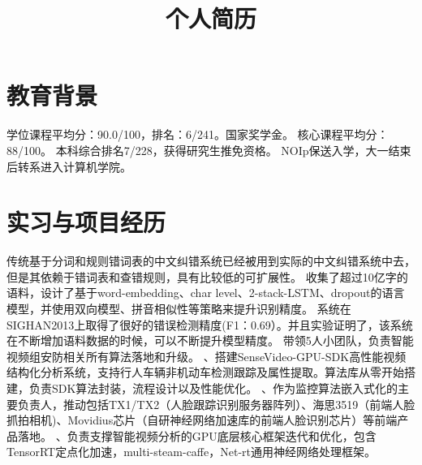 \documentclass[11pt,a4paper]{moderncv}
\title{个人简历}               %
\begin{document}
\maketitle

\section{教育背景}
{学位课程平均分：90.0/100，排名：6/241。国家奖学金。}
{核心课程平均分：88/100。
本科综合排名7/228，获得研究生推免资格。}
{NOIp保送入学，大一结束后转系进入计算机学院。}
\section{实习与项目经历}
{传统基于分词和规则错词表的中文纠错系统已经被用到实际的中文纠错系统中去，但是其依赖于错词表和查错规则，具有比较低的可扩展性。
\newline
收集了超过10亿字的语料，设计了基于word-embedding、char level、2-stack-LSTM、dropout的语言模型，并使用双向模型、拼音相似性等策略来提升识别精度。
\newline
系统在SIGHAN2013上取得了很好的错误检测精度(F1：0.69）。并且实验证明了，该系统在不断增加语料数据的时候，可以不断提升模型精度。 }
{
带领5人小团队，负责智能视频组安防相关所有算法落地和升级。
、搭建SenseVideo-GPU-SDK高性能视频结构化分析系统，支持行人车辆非机动车检测跟踪及属性提取。算法库从零开始搭建，负责SDK算法封装，流程设计以及性能优化。
、作为监控算法嵌入式化的主要负责人，推动包括TX1/TX2（人脸跟踪识别服务器阵列）、海思3519（前端人脸抓拍相机)、Movidius芯片（自研神经网络加速库的前端人脸识别芯片）等前端产品落地。
、负责支撑智能视频分析的GPU底层核心框架迭代和优化，包含TensorRT定点化加速，multi-steam-caffe，Net-rt通用神经网络处理框架。
}
\end{document}
